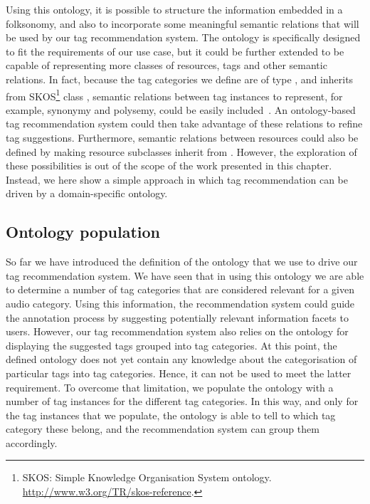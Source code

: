 Using this ontology, it is possible to structure the information embedded in a folksonomy, and also to incorporate some meaningful semantic relations that will be used by our tag recommendation system. 
The ontology is specifically designed to fit the requirements of our use case, but it could be further extended to be capable of representing more classes of resources, tags and other semantic relations.
In fact, because the tag categories we define are of type , and  inherits from SKOS\footnote{SKOS: Simple Knowledge Organisation System ontology. \url{http://www.w3.org/TR/skos-reference}.} class , semantic relations between tag instances to represent, for example, synonymy and polysemy, could be easily included~\citep{Echarte2007,Lohmann2011}. An ontology-based tag recommendation system could then take advantage of these relations to refine tag suggestions. Furthermore, semantic relations between resources could also be defined by making resource subclasses inherit from . 
However, the exploration of these possibilities is out of the scope of the work presented in this chapter.
Instead, we here show a simple approach in which tag recommendation can be driven by a domain-specific ontology.


\subsection{Ontology population}
\label{sec:ontology:population}

So far we have introduced the definition of the ontology that we use to drive our tag recommendation system.
We have seen that in using this ontology we are able to determine a number of tag categories that are considered relevant for a given audio category.
Using this information, the recommendation system could guide the annotation process by suggesting potentially relevant information facets to users.
However, our tag recommendation system also relies on the ontology for displaying the suggested tags grouped into tag categories.
At this point, the defined ontology does not yet contain any knowledge about the categorisation of particular tags into tag categories. Hence, it can not be used to meet the latter requirement. 
To overcome that limitation, we populate the ontology with a number of tag instances for the different tag categories.
In this way, and only for the tag instances that we populate, the ontology is able to tell to which tag category these belong, and the recommendation system can group them accordingly.

